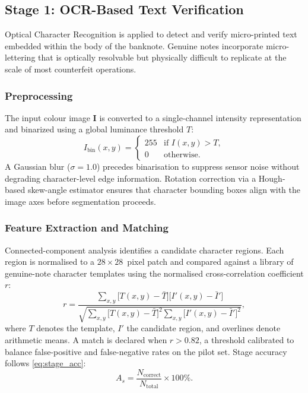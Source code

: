 \documentclass[journal]{IEEEtran}
\begin{document}
\subsection{Stage 1: OCR-Based Text Verification}
\label{subsec:ocr}

Optical Character Recognition is applied to detect and verify micro-printed text embedded within the body of the banknote. Genuine notes incorporate micro-lettering that is optically resolvable but physically difficult to replicate at the scale of most counterfeit operations.

\subsubsection{Preprocessing}
The input colour image $\mathbf{I}$ is converted to a single-channel intensity representation and binarized using a global luminance threshold $T$:
\begin{equation}
  I_{\mathrm{bin}}(x,y) =
  \begin{cases}
    255 & \text{if } I(x,y) > T, \\
    0   & \text{otherwise.}
  \end{cases}
  \label{eq:binarisation}
\end{equation}
A Gaussian blur ($\sigma = 1.0$) precedes binarisation to suppress sensor noise without degrading character-level edge information. Rotation correction via a Hough-based skew-angle estimator ensures that character bounding boxes align with the image axes before segmentation proceeds.

\subsubsection{Feature Extraction and Matching}
Connected-component analysis identifies a candidate character regions. Each region is normalised to a $28 \times 28$~pixel patch and compared against a library of genuine-note character templates using the normalised cross-correlation coefficient $r$:
\begin{equation}
  r = \frac
    {\sum_{x,y}\bigl[T(x,y)-\bar{T}\bigr]\bigl[I'(x,y)-\bar{I}'\bigr]}
    {\sqrt{
      \sum_{x,y}\bigl[T(x,y)-\bar{T}\bigr]^2
      \sum_{x,y}\bigl[I'(x,y)-\bar{I}'\bigr]^2
    }},
  \label{eq:ncc}
\end{equation}
where $T$ denotes the template, $I'$ the candidate region, and overlines denote arithmetic means. A match is declared when $r > 0.82$, a threshold calibrated to balance false-positive and false-negative rates on the pilot set. Stage accuracy follows \eqref{eq:stage_acc}:
\begin{equation}
  A_s = \frac{N_{\mathrm{correct}}}{N_{\mathrm{total}}} \times 100\%.
  \label{eq:stage_acc}
\end{equation}
\end{document}
